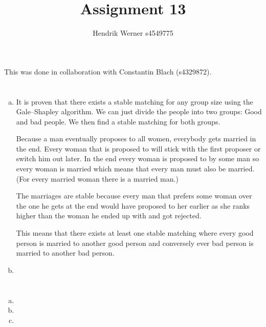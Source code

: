 \documentclass[12pt, a4paper]{article}
\title{Assignment 13}
\author{Hendrik Werner s4549775}
\begin{document}
\maketitle

This was done in collaboration with Constantin Blach (s4329872).

\section{} %
\begin{enumerate}[(a)]
	\item %
	It is proven that there exists a stable matching for any group size using the Gale–Shapley algorithm. We can just divide the people into two groups: Good and bad people. We then find a stable matching for both groups.

	Because a man eventually proposes to all women, everybody gets married in the end. Every woman that is proposed to will stick with the first proposer or switch him out later. In the end every woman is proposed to by some man so every woman is married which means that every man must also be married. (For every married woman there is a married man.)

	The marriages are stable because every man that prefers some woman over the one he gets at the end would have proposed to her earlier as she ranks higher than the woman he ended up with and got rejected.

	This means that there exists at least one stable matching where every good person is married to another good person and conversely ever bad person is married to another bad person.

	\item %
\end{enumerate}

\section{} %

\section{} %

\section{} %
\begin{enumerate}[(a)]
	\item %
	\item %
	\item %
\end{enumerate}
\end{document}

